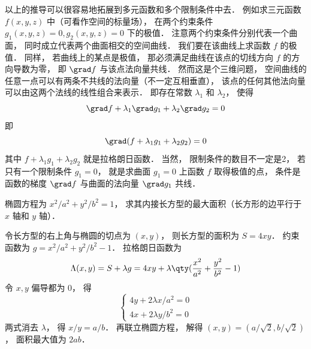 以上的推导可以很容易地拓展到多元函数和多个限制条件中去． 例如求三元函数 $f(x,y,z)$ 中（可看作空间的标量场）， 在两个约束条件 $g_1(x,y,z) = 0, g_2(x,y,z) = 0$ 下的极值． 注意两个约束条件分别代表一个曲面， 同时成立代表两个曲面相交的空间曲线． 我们要在该曲线上求函数 $f$ 的极值． 同样， 若曲线上的某点是极值， 那必须满足曲线在该点的切线方向 $f$ 的方向导数为零， 即 $\grad f$ 与该点法向量共线． 然而这是个三维问题， 空间曲线的任意一点可以有两条不共线的法向量（不一定互相垂直）， 该点的任何其他法向量可以由这两个法线的线性组合来表示． 即存在常数 $\lambda_1$ 和 $\lambda_2$， 使得
\begin{equation}
\grad f + \lambda_1 \grad g_1 + \lambda_2 \grad g_2 = 0
\end{equation}
即
\begin{equation}
\grad (f + \lambda_1 g_1 + \lambda_2 g_2) = 0
\end{equation}
其中 $f + \lambda_1 g_1 + \lambda_2 g_2$ 就是拉格朗日函数． 当然， 限制条件的数目不一定是2， 若只有一个限制条件 $g_1 = 0$， 就是求曲面 $g_1 = 0$ 上函数 $f$ 取得极值的点， 条件是函数的梯度 $\grad f$ 与曲面的法向量 $\grad g_1$ 共线．

\begin{example}{}
椭圆方程为 $x^2/a^2 + y^2/b^2 = 1$， 求其内接长方型的最大面积（长方形的边平行于 $x$ 轴和 $y$ 轴）．

令长方型的右上角与椭圆的切点为 $(x,y)$， 则长方型的面积为 $S = 4xy$． 约束函数为 $g = x^2/a^2 + y^2/b^2 - 1$． 拉格朗日函数为
\begin{equation}
\Lambda(x,y) = S + \lambda g = 4xy + \lambda \qty(\frac{x^2}{a^2} + \frac{y^2}{b^2} - 1)
\end{equation}
令 $x, y$ 偏导都为 0， 得
\begin{equation}
\begin{cases}
4y + 2\lambda x/a^2 = 0\\
4x + 2\lambda y/b^2 = 0
\end{cases}
\end{equation}
两式消去 $\lambda$， 得 $x/y = a/b$． 再联立椭圆方程， 解得 $(x,y) = (a/\sqrt{2}, b/\sqrt{2})$， 面积最大值为 $2ab$．
\end{example}